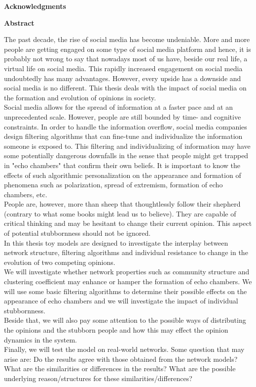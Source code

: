 \documentclass[11 pt , letterpaper , twoside , openright]{book}
\newenvironment{abstract}%
{\cleardoublepage\null \vfill\begin{center}\bfseries \abstractname \end{center}}{\vfill\null}
\begin{document}
\pagestyle{plain}
\renewcommand{\abstractname}{Acknowledgments}
\begin{abstract}

\end{abstract}

\renewcommand{\abstractname}{Abstract}
\begin{abstract}
The past decade, the rise of social media has become undeniable. More and more people are getting engaged on some type of social media platform and hence, it is probably not wrong to say that nowadays most of us have, beside our real life, a virtual life on social media. This rapidly increased engagement on social media undoubtedly has many advantages. However, every upside has a downside and social media is no different. This thesis deals with the impact of social media on the formation and evolution of opinions in society.\\ 
Social media allows for the spread of information at a faster pace and at an unprecedented scale. However, people are still bounded by time- and cognitive constraints. In order to handle the information overflow, social media companies design filtering algorithms that can fine-tune and individualize the information someone is exposed to. This filtering and individualizing of information may have some potentially dangerous downfalls in the sense that people might get trapped in "echo chambers" that confirm their own beliefs. It is important to know the effects of such algorithmic personalization on the appearance and formation of phenomena such as polarization, spread of extremism, formation of echo chambers, etc.\\
People are, however, more than sheep that thoughtlessly follow their shepherd (contrary to what some books might lead us to believe). They are capable of critical thinking and may be hesitant to change their current opinion. This aspect of potential stubbornness should not be ignored.\\
In this thesis toy models are designed to investigate the interplay between network structure, filtering algorithms and individual resistance to change in the evolution of two competing opinions.\\
We will investigate whether network properties such as community structure and clustering coefficient may enhance or hamper the formation of echo chambers. We will use some basic filtering algorithms to determine their possible effects on the appearance of echo chambers and we will investigate the impact of individual stubbornness. \\
Beside that, we will also pay some attention to the possible ways of distributing the opinions and the stubborn people and how this may effect the opinion dynamics in the system. \\
Finally, we will test the model on real-world networks. Some question that may arise are: Do the results agree with those obtained from the network models? What are the similarities or differences in the results? What are the possible underlying reason/structures for these similarities/differences?\\


\end{abstract}
\end{document}
